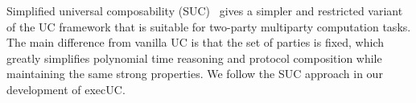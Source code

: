 Simplified universal composability (SUC)~\cite{canetti2015simpler} gives a
simpler and restricted variant of the UC framework that is suitable for
two-party multiparty computation tasks. The main difference from vanilla UC is
that the set of parties is fixed, which greatly simplifies polynomial time
reasoning and protocol composition while maintaining the same strong properties.
We follow the SUC approach in our development of \textsf{execUC}.

\begin{comment}
\begin{enumerate}[leftmargin=*]
  \item Symbolic UC~\cite{bohl2016symbolic} transports ideas from the UC
    framework to the symbolic model of cryptography, in which cryptographic
    operations are abstracted as a term process algebra (specifically, a variant
    of the applied $\pi$-calculus) and adversary capabilities are defined by
    deduction rules over these terms. In particular, they show that certain
    aspects of the UC framework, such as ideal functionality specifications and
    UC composition, still carry over to the symbolic model. They are also able
    to show that certain results, such as the impossibility of UC commitments in
    the standard model of cryptography, can still be observed in the symbolic
    model. Although this abstract vantage point leads to simpler security proofs
    that can be amenable to automated reasoning, security guarantees derived
    from symbolic analyses are not as strong as those from computational
    analyses considered in UC and in cryptography more broadly.
  \item RSIM~\cite{backes2007reactive}.
  \item CertiCrypt~\cite{barthe2009formal} is a framework (built on
    Coq~\cite{barras1997coq}) that supports machine-checked game-based proofs of
    security. It includes tools to reason about the equivalence of probabilistic
    programs, a relational Hoare logic, a theory of observational equivalence,
    verified program transformations, and game-based techniques.  Their
    experience shows that the type system and automated tactics provide valuable
    information in debugging proofs.
  \item EasyCrypt~\cite{barthe2011computer} is follow-up work on CertiCrypt,
    which permits more automation and shorter proof scripts. \todo{Details on
      their imperative language?}
  \item ProVerif~\cite{blanchet2010proverif} is a tool for symbolically

\end{comment}
